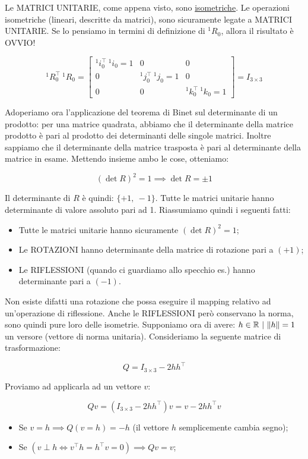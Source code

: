 Le MATRICI UNITARIE, come appena visto, sono \underline{isometriche}. Le operazioni isometriche (lineari, descritte da matrici), sono sicuramente legate a MATRICI UNITARIE. Se lo pensiamo in termini di definizione di $^1R_0$, allora il risultato è OVVIO!

\[
	^1R_0^\top\ ^1R_0 =
	\begin{bmatrix}^1i_0^\top\ ^1i_0 = 1 & 0 & 0\\0 & ^1j_0^\top\ ^1j_0 = 1 & 0\\0 & 0 & ^1k_0^\top\ ^1k_0 = 1\end{bmatrix} = I_{3\times 3}
\]

Adoperiamo ora l'applicazione del teorema di Binet sul determinante di un prodotto: per una matrice quadrata, abbiamo che il determinante della matrice prodotto è pari al prodotto dei determinanti delle singole matrici. Inoltre sappiamo che il determinante della matrice trasposta è pari al determinante della matrice in esame. Mettendo insieme ambo le cose, otteniamo:

\[
	(\det{R})^2 = 1 \implies \det{R} = \pm 1
\]

Il determinante di $R$ è quindi: $\{+1,\ -1\}$. Tutte le matrici unitarie hanno determinante di valore assoluto pari ad 1. Riassumiamo quindi i seguenti fatti:

\begin{itemize} 

\item Tutte le matrici unitarie hanno sicuramente $(\det{R})^2 = 1$;
\item Le ROTAZIONI hanno determinante della matrice di rotazione pari a $(+1)$;
\item Le RIFLESSIONI (quando ci guardiamo allo specchio es.) hanno determinante pari a $(-1)$.

\end{itemize}

Non esiste difatti una rotazione che possa eseguire il mapping relativo ad un'operazione di riflessione. Anche le RIFLESSIONI però conservano la norma, sono quindi pure loro delle isometrie. Supponiamo ora di avere: $h\in\mathbb{R}\ |\ \lVert h\rVert=1$ un versore (vettore di norma unitaria). Consideriamo la seguente matrice di trasformazione:

\[
	Q = I_{3\times 3} - 2hh^\top
\]

Proviamo ad applicarla ad un vettore $v$:

\[
	Qv = (I_{3\times 3} - 2hh^\top)v = v - 2hh^\top v
\]

\begin{itemize}

\item Se $v=h \implies Q(v=h) = -h$ (il vettore $h$ semplicemente cambia segno);
\item Se $(v\perp h \iff v^\top h=h^\top v=0) \implies Qv = v$;

\end{itemize}

